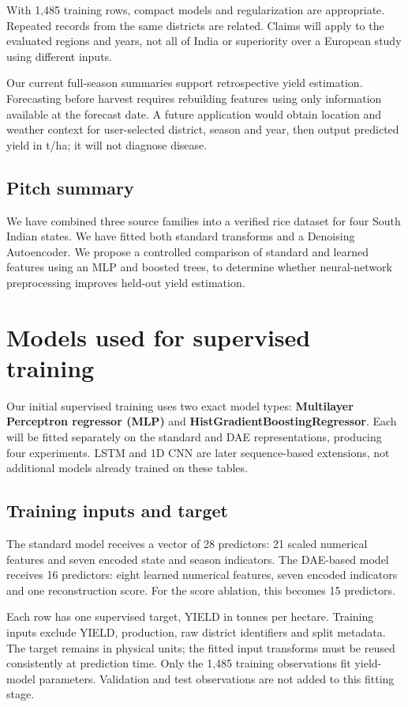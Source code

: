 \documentclass[11pt,a4paper]{article}
\begin{document}
With 1,485 training rows, compact models and regularization are appropriate. Repeated records from the same districts are related. Claims will apply to the evaluated regions and years, not all of India or superiority over a European study using different inputs.

Our current full-season summaries support retrospective yield estimation. Forecasting before harvest requires rebuilding features using only information available at the forecast date. A future application would obtain location and weather context for user-selected district, season and year, then output predicted yield in t/ha; it will not diagnose disease.

\subsection*{Pitch summary}
We have combined three source families into a verified rice dataset for four South Indian states. We have fitted both standard transforms and a Denoising Autoencoder. We propose a controlled comparison of standard and learned features using an MLP and boosted trees, to determine whether neural-network preprocessing improves held-out yield estimation.

\clearpage\section*{Models used for supervised training}
Our initial supervised training uses two exact model types: \textbf{Multilayer Perceptron regressor (MLP)} and \textbf{HistGradientBoostingRegressor}. Each will be fitted separately on the standard and DAE representations, producing four experiments. LSTM and 1D CNN are later sequence-based extensions, not additional models already trained on these tables.

\subsection*{Training inputs and target}
The standard model receives a vector of 28 predictors: 21 scaled numerical features and seven encoded state and season indicators. The DAE-based model receives 16 predictors: eight learned numerical features, seven encoded indicators and one reconstruction score. For the score ablation, this becomes 15 predictors.

Each row has one supervised target, YIELD in tonnes per hectare. Training inputs exclude YIELD, production, raw district identifiers and split metadata. The target remains in physical units; the fitted input transforms must be reused consistently at prediction time. Only the 1,485 training observations fit yield-model parameters. Validation and test observations are not added to this fitting stage.
\end{document}
